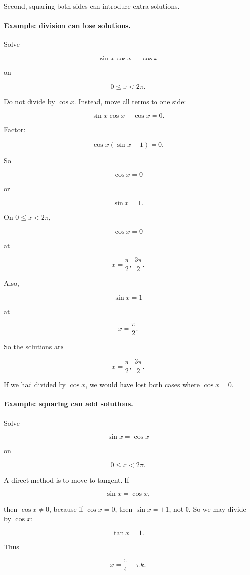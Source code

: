 Second, squaring both sides can introduce extra solutions.

\paragraph{Example: division can lose solutions.}
Solve

\[
\sin x\cos x=\cos x
\]

on

\[
0\le x<2\pi.
\]

Do not divide by \(\cos x\).  Instead, move all terms to one side:

\[
\sin x\cos x-\cos x=0.
\]

Factor:

\[
\cos x(\sin x-1)=0.
\]

So

\[
\cos x=0
\]

or

\[
\sin x=1.
\]

On \(0\le x<2\pi\),

\[
\cos x=0
\]

at

\[
x=\frac{\pi}{2},\ \frac{3\pi}{2}.
\]

Also,

\[
\sin x=1
\]

at

\[
x=\frac{\pi}{2}.
\]

So the solutions are

\[
\boxed{
x=\frac{\pi}{2},\ \frac{3\pi}{2}.
}
\]

If we had divided by \(\cos x\), we would have lost both cases where \(\cos x=0\).

\paragraph{Example: squaring can add solutions.}
Solve

\[
\sin x=\cos x
\]

on

\[
0\le x<2\pi.
\]

A direct method is to move to tangent.  If

\[
\sin x=\cos x,
\]

then \(\cos x\neq0\), because if \(\cos x=0\), then \(\sin x=\pm1\), not \(0\).
So we may divide by \(\cos x\):

\[
\tan x=1.
\]

Thus

\[
x=\frac{\pi}{4}+\pi k.
\]

